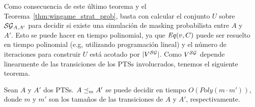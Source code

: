 Como consecuencia de este último teorema y el Teorema~\ref{thm:wingame_strat_prob}, basta con calcular el conjunto $U$
sobre $\mathcal{SG}_{A,A'}$ para decidir si existe una simulación de masking probabilista
entre $A$ y $A'$.
%
Esto se puede hacer en tiempo polinomial, ya que $\mathit{Eq}(v,C)$ puede ser resuelto en tiempo polinomial (e.g, utilizando programación lineal) y el número de iteraciones para construir $U$ está acotado por $|V^{\mathcal{SG}}|$.  Como $V^{\mathcal{SG}}$ depende linearmente de las transiciones de los PTSs involucrados, tenemos el siguiente teorema.

\begin{theorem}
  Sean $A$ y $A'$ dos PTSs.  $A \preceq_{m} A'$ se puede decidir en tiempo 
  $O(\textit{Poly}(m\cdot m'))$, donde $m$ y $m'$ son 
  los tamaños de las transiciones de $A$ y $A'$, respectivamente.
\end{theorem} 






